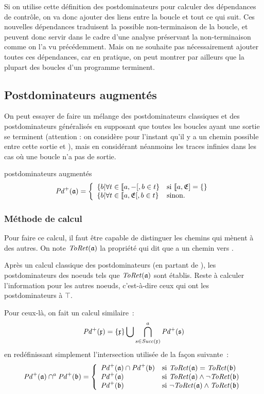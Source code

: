 Si on utilise cette définition des postdominateurs pour calculer des dépendances
de contrôle, on va donc ajouter des liens entre la boucle et tout ce qui suit.
Ces nouvelles dépendances traduisent la possible non-terminaison de la boucle,
et peuvent donc servir dans le cadre d'une analyse préservant la non-terminaison
comme on l'a vu précédemment.
Mais on ne souhaite pas nécessairement ajouter toutes ces dépendances,
car en pratique, on peut montrer par ailleurs que la plupart des boucles
d'un programme terminent.

\subsection{Postdominateurs augmentés}\label{sec-pda}

On peut essayer de faire un mélange des postdominateurs classiques et des
postdominateurs généralisés en supposant que toutes les boucles ayant une
sortie se terminent (attention : on considère pour l'instant qu'il y a un chemin
possible entre cette sortie et \nE), mais en considérant néanmoins
les traces infinies dans les cas où une boucle n'a pas de sortie.

\begin{definition}{postdominateurs augmentés}
$$
\mathit{Pd}^{+}(\mathfrak{a}) = \left\{
\begin{array}{ll}
\{ b | \forall t \in \llbracket a, -[, b \in t \}
  & \mbox{si } \llbracket a, \mathfrak{E}] = \{\}\\
\{ b | \forall t \in \llbracket a, \mathfrak{E}[, b \in t \}
  & \mbox{sinon.}
\end{array}\right.
$$
\end{definition}


\subsubsection{Méthode de calcul}

\newcommand{\ToRet}[1]{\ensuremath{\mathit{ToRet}(\n{#1})}}

Pour faire ce calcul, il faut être capable de distinguer les chemins qui mènent
à \nE{} des autres.
On note \ToRet{a} la propriété qui dit que  a un chemin vers \nE.

Après un calcul classique des postdominateurs (en partant de \nE),
les postdominateurs des noeuds tels que  \ToRet{a} sont établis.
Reste à calculer l'information pour les autres noeuds, c'est-à-dire ceux qui
ont les postdominateurs à $\top$.

Pour ceux-là, on fait un calcul similaire~:
$$
\mathit{Pd}^{+}(\mathfrak{x}) = \{\mathfrak{x}\} \bigcup \bigcap^a_{s \in \mathit{Succ}(\mathfrak{x})} \mathit{Pd}^{+}(\mathfrak{s})
$$
en redéfinissant simplement l'intersection utilisée de la façon suivante~:
$$
\Pda{a} \cap^a \Pda{b} =  \left\{
\begin{array}{ll}
  \Pda{a} \cap \Pda{b} & \text{si } \ToRet{a} = \ToRet{b}\\
  \Pda{a}              & \text{si } \ToRet{a} \et \neg\ToRet{b}\\
  \Pda{b}              & \text{si } \neg\ToRet{a} \et \ToRet{b}\\
\end{array}\right.
$$


